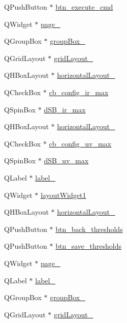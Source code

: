 \begin{DoxyCompactItemize}
Q\+Push\+Button $\ast$ \hyperlink{a00080_a9ea50d44e38316e4203933698cbc14a6}{btn\+\_\+execute\+\_\+cmd}
\item 
Q\+Widget $\ast$ \hyperlink{a00080_ac682cb2a9b686ca7c3d29771ad9ccb48}{page\+\_}
\item 
Q\+Group\+Box $\ast$ \hyperlink{a00080_ad8a919e5634add9c41bfc319cb9fd338}{group\+Box\+\_}
\item 
Q\+Grid\+Layout $\ast$ \hyperlink{a00080_a8731b71c513ff94baf59614807823c5d}{grid\+Layout\+\_}
\item 
Q\+H\+Box\+Layout $\ast$ \hyperlink{a00080_ae183387a7d233b437a637b403ba39ffd}{horizontal\+Layout\+\_}
\item 
Q\+Check\+Box $\ast$ \hyperlink{a00080_ae78fd3c777d081ab1ec1d0142bec3320}{cb\+\_\+config\+\_\+ir\+\_\+max}
\item 
Q\+Spin\+Box $\ast$ \hyperlink{a00080_a220706f1fd93857145032c897e55d9e3}{d\+S\+B\+\_\+ir\+\_\+max}
\item 
Q\+H\+Box\+Layout $\ast$ \hyperlink{a00080_a14c9d4842c3e97e16e7873ef0aecdb1e}{horizontal\+Layout\+\_}
\item 
Q\+Check\+Box $\ast$ \hyperlink{a00080_a13ce5fddc83683d7b8b717f0b9a4e2cf}{cb\+\_\+config\+\_\+uv\+\_\+max}
\item 
Q\+Spin\+Box $\ast$ \hyperlink{a00080_aa2872ada374dace81c4f1cc41d8e244d}{d\+S\+B\+\_\+uv\+\_\+max}
\item 
Q\+Label $\ast$ \hyperlink{a00080_ad6bab8fb8903b8f41afea1218ee52695}{label\+\_}
\item 
Q\+Widget $\ast$ \hyperlink{a00080_aab31b3dec8d767525dea6f163e029e48}{layout\+Widget1}
\item 
Q\+H\+Box\+Layout $\ast$ \hyperlink{a00080_a2071e5a4c77a64f74d74ac246bbc683c}{horizontal\+Layout\+\_}
\item 
Q\+Push\+Button $\ast$ \hyperlink{a00080_a5a4e0ac94bd22955cc41bcc276a04278}{btn\+\_\+back\+\_\+thresholds}
\item 
Q\+Push\+Button $\ast$ \hyperlink{a00080_ac265ae0ccaa1154deaa634d19415f775}{btn\+\_\+save\+\_\+thresholds}
\item 
Q\+Widget $\ast$ \hyperlink{a00080_ad52b1b3da7f1a695b9d3b521254c961d}{page\+\_}
\item 
Q\+Label $\ast$ \hyperlink{a00080_a663f728e6244926a795c6e6892673b1d}{label\+\_}
\item 
Q\+Group\+Box $\ast$ \hyperlink{a00080_a40a9931365fd3679efec4f0112073db2}{group\+Box\+\_}
\item 
Q\+Grid\+Layout $\ast$ \hyperlink{a00080_a4c2d544352d423a361b8ab2e1d5636ec}{grid\+Layout\+\_}

\end{DoxyCompactItemize}

